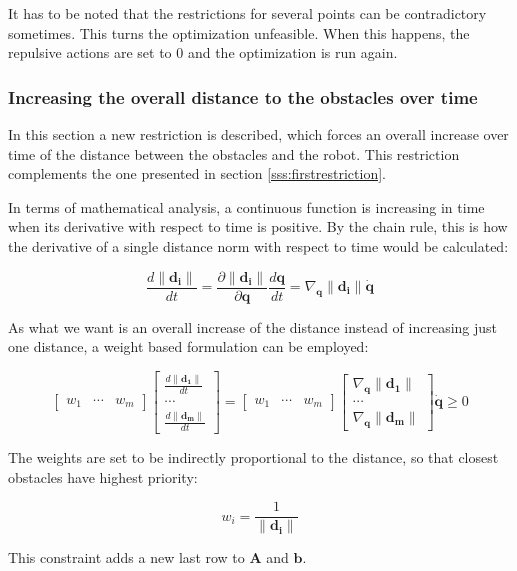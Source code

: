 It has to be noted that the restrictions for several points can be contradictory sometimes. This turns the optimization unfeasible. When this happens, the repulsive actions are set to $0$ and the optimization is run again.

\subsubsection{Increasing the overall distance to the obstacles over time}
\label{sss:secondrestriction}

In this section a new restriction is described, which forces an overall increase over time of the distance between the obstacles and the robot. This restriction complements the one presented in section \ref{sss:firstrestriction}.

In terms of mathematical analysis, a continuous function is increasing in time when its derivative with respect to time is positive. By the chain rule, this is how the derivative of a single distance norm with respect to time would be calculated:

\begin{equation*}
    \frac{ d \|\mathbf{d_i}\|}{dt} =
    \frac{ \partial \|\mathbf{d_i}\|}{\partial \mathbf{q}} \frac{d \mathbf{q}}{dt} =
    \nabla_{\mathbf{q}}\|\mathbf{d_i}\| \dot{\mathbf{q}}
\end{equation*}

As what we want is an overall increase of the distance instead of increasing just one distance, a weight based formulation can be employed:

\begin{equation*}
    \begin{bmatrix}
        w_1 & \cdots & w_m
    \end{bmatrix}
    \begin{bmatrix}
        \frac{ d \|\mathbf{d_1}\|}{dt} \\ \cdots \\ \frac{ d \|\mathbf{d_m}\|}{dt}
    \end{bmatrix}
    =
    \begin{bmatrix}
        w_1 & \cdots & w_m
    \end{bmatrix}
    \begin{bmatrix}
        \nabla_{\mathbf{q}}\|\mathbf{d_1}\| \\
        \cdots \\
        \nabla_{\mathbf{q}}\|\mathbf{d_m}\|
    \end{bmatrix}
    \dot{\mathbf{q}}
    \geq 0
\end{equation*}

The weights are set to be indirectly proportional to the distance, so that closest obstacles have highest priority:

\begin{equation*}
    w_i = \frac{1}{\|\mathbf{d_i}\|}
\end{equation*}

This constraint adds a new last row to $\mathbf{A}$ and $\mathbf{b}$.
